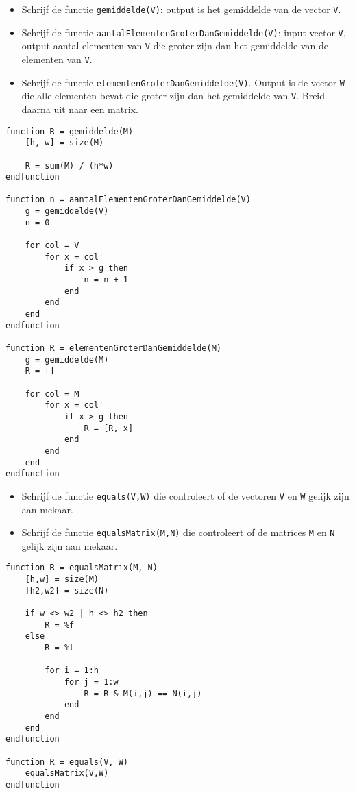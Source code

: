 \begin{oef}
\begin{itemize}
  \item Schrijf de functie \verb/gemiddelde(V)/: output is het gemiddelde van de vector \verb/V/.
  \item Schrijf de functie \verb/aantalElementenGroterDanGemiddelde(V)/: input vector \verb/V/, output aantal elementen van \verb/V/ die groter zijn dan het gemiddelde van de elementen van \verb/V/.
  \item Schrijf de functie \verb/elementenGroterDanGemiddelde(V)/. Output is de vector \verb/W/ die alle elementen bevat die groter zijn dan het gemiddelde van \verb/V/. Breid daarna uit naar een matrix.
\end{itemize}
\begin{opl}
\begin{lstlisting}
function R = gemiddelde(M)
    [h, w] = size(M)
    
    R = sum(M) / (h*w)
endfunction

function n = aantalElementenGroterDanGemiddelde(V)
    g = gemiddelde(V)
    n = 0
    
    for col = V
        for x = col'
            if x > g then
                n = n + 1
            end
        end
    end
endfunction

function R = elementenGroterDanGemiddelde(M)
    g = gemiddelde(M)
    R = []
    
    for col = M
        for x = col'
            if x > g then
                R = [R, x]
            end
        end
    end
endfunction
\end{lstlisting}
\end{opl}
\end{oef}

\begin{oef}
\begin{itemize}
  \item Schrijf de functie \verb/equals(V,W)/ die controleert of de vectoren \verb/V/ en \verb/W/ gelijk zijn aan mekaar.
  \item Schrijf de functie \verb/equalsMatrix(M,N)/ die controleert of de matrices \verb/M/ en \verb/N/ gelijk zijn aan mekaar.
\end{itemize}
\begin{opl}
\begin{lstlisting}
function R = equalsMatrix(M, N)
    [h,w] = size(M)
    [h2,w2] = size(N)
    
    if w <> w2 | h <> h2 then
        R = %f
    else
        R = %t
        
        for i = 1:h
            for j = 1:w
                R = R & M(i,j) == N(i,j)
            end
        end
    end
endfunction

function R = equals(V, W)
    equalsMatrix(V,W)
endfunction
\end{lstlisting}
\end{opl}
\end{oef}


